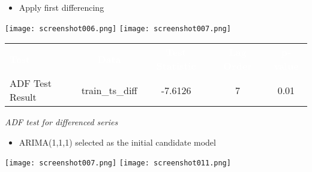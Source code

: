\documentclass[11pt]{beamer}
\begin{document}
\begin{frame}	

	
	\begin{itemize}
		\item Apply first differencing 
	\end{itemize}
		\vspace{0.5cm}
	\graphicspath{{C:/Users/MSI/OneDrive/Attachments/Pictures/}}
	\centering
		\texttt{[image: screenshot006.png]}%
		\hfill
		\texttt{[image: screenshot007.png]}
		
		\vspace{0.8cm} %
		
		\begin{table}[H]
		\setlength{\tabcolsep}{6pt} 
		\renewcommand{\arraystretch}{1.3} 
		\begin{tabular}{l c c c c}
			\rowcolor{navy!80} 
			\textcolor{white}{\textbf{Test}} & 
			\textcolor{white}{\textbf{Data}} & 
			\textcolor{white}{\textbf{Test Statistic}} & 
			\textcolor{white}{\textbf{Lag Order}} & 
			\textcolor{white}{\textbf{p-value}} \\
			\rowcolor{blue!15} ADF Test Result & train\_ts\_diff & \textcolor{navy!20!black}{-7.6126} & 7 & \textcolor{red!70!black}{0.01} \\
		\end{tabular}
		{\footnotesize\textit{ADF test for differenced series}}
	\end{table}
	
\end{frame}	
	
	\begin{frame}
		\begin{itemize}
			\item ARIMA(1,1,1) selected as the initial candidate model
		\end{itemize}
		\vspace{0.5cm}
		\graphicspath{{C:/Users/MSI/OneDrive/Attachments/Pictures/}}
		\centering
		\texttt{[image: screenshot007.png]}%
		\hfill
		\texttt{[image: screenshot011.png]}
		
	\end{frame}
	
	
\end{document}
